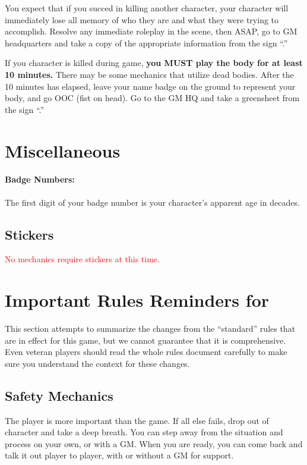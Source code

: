 \documentclass[sheet]{GL2020}
\begin{document}
You expect that if you succed in killing another character, your character will immediately lose all memory of who they are and what they were trying to accomplish. Resolve any immediate roleplay in the scene, then ASAP, go to GM headquarters and take a copy of the appropriate information from the sign ``\sMurderConsequences{}.''

If you character is killed during game, \textbf{you MUST play the body for at least 10 minutes.} There may be some mechanics that utilize dead bodies. After the 10 minutes has elapsed, leave your name badge on the ground to represent your body, and go OOC (fist on head). Go to the GM HQ and take a greensheet from the sign ``\sMurdered{}.''

\section{Miscellaneous}

\paragraph{Badge Numbers:} The first digit of your badge number is your character's apparent age in decades.

\subsection{Stickers}
\textcolor{red}{No mechanics require stickers at this time.}

\section{Important Rules Reminders for \gamename}
This section attempts to summarize the changes from the ``standard'' rules that are in effect for this game, but we cannot guarantee that it is comprehensive. Even veteran players should read the whole rules document carefully to make sure you understand the context for these changes.

\subsection{Safety Mechanics}
The player is more important than the game. If all else fails, drop out of character and take a deep breath. You can step away from the situation and process on your own, or with a GM. When you are ready, you can come back and talk it out player to player, with or without a GM for support.
\end{document}

